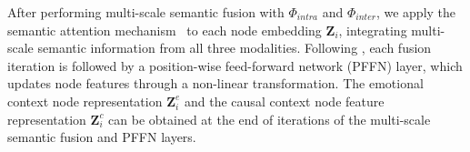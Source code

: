 \documentclass[11pt]{article}
\begin{document}
After performing multi-scale semantic fusion with $\Phi_{intra}$ and $\Phi_{inter}$, we apply the semantic attention mechanism~\cite{HAN} to each node embedding $\bm{Z}_i$, integrating multi-scale semantic information from all three modalities.
Following \cite{MPEG}, each fusion iteration is followed by a position-wise feed-forward network (PFFN) layer, which updates node features through a non-linear transformation.
The emotional context node  representation $\bm{Z}_i^e$ and the causal context node feature representation $\bm{Z}_i^c$ can be obtained at the end of iterations of the multi-scale semantic fusion and PFFN layers.
\end{document}
